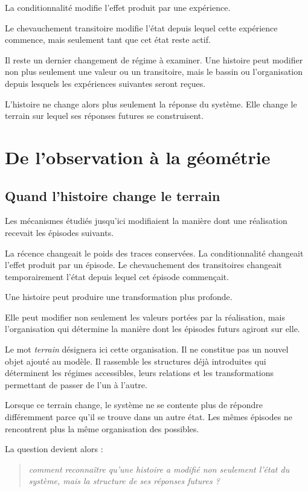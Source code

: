 La conditionnalité modifie l'effet produit par une expérience.

Le chevauchement transitoire modifie l'état depuis lequel cette expérience commence, mais seulement tant que cet état reste actif.

Il reste un dernier changement de régime à examiner. Une histoire peut modifier non plus seulement une valeur ou un transitoire, mais le bassin ou l'organisation depuis lesquels les expériences suivantes seront reçues.

L'histoire ne change alors plus seulement la réponse du système. Elle change le terrain sur lequel ses réponses futures se construisent.

\part{De l'observation à la géométrie}
\chapter{Quand l'histoire change le terrain}
\label{t3-histoire-change-terrain}

Les mécanismes étudiés jusqu'ici modifiaient la manière dont une réalisation recevait les épisodes suivants.

La récence changeait le poids des traces conservées. La conditionnalité changeait l'effet produit par un épisode. Le chevauchement des transitoires changeait temporairement l'état depuis lequel cet épisode commençait.

Une histoire peut produire une transformation plus profonde.

Elle peut modifier non seulement les valeurs portées par la réalisation, mais l'organisation qui détermine la manière dont les épisodes futurs agiront sur elle.

Le mot \emph{terrain} désignera ici cette organisation. Il ne constitue pas un nouvel objet ajouté au modèle. Il rassemble les structures déjà introduites qui déterminent les régimes accessibles, leurs relations et les transformations permettant de passer de l'un à l'autre.

Lorsque ce terrain change, le système ne se contente plus de répondre différemment parce qu'il se trouve dans un autre état. Les mêmes épisodes ne rencontrent plus la même organisation des possibles.

La question devient alors :
\begin{quote}
\itshape comment reconnaître qu'une histoire a modifié non seulement l'état du système, mais la structure de ses réponses futures ?
\end{quote}

